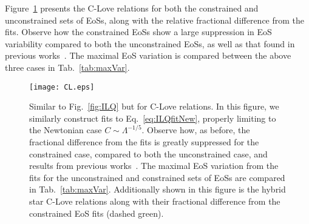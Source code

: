 \documentclass[prd,twocolumn,nofootinbib,superscriptaddress,amsmath,amssymb]{revtex4-1}
\begin{document}
Figure~\ref{fig:clove} presents the C-Love relations for both the constrained and unconstrained sets of EoSs, along with the relative fractional difference from the fits. 
Observe how the constrained EoSs show a large suppression in EoS variability compared to both the unconstrained EoSs, as well as that found in previous works~\cite{Yagi:binLove}.
The maximal EoS variation is compared between the above three cases in Tab.~\ref{tab:maxVar}.
\begin{figure}
\begin{center} 
\texttt{[image: CL.eps]}
\end{center}
\caption{
Similar to Fig.~\ref{fig:ILQ} but for C-Love relations.
In this figure, we similarly construct fits to  Eq.~\ref{eq:ILQfitNew}, properly limiting to the Newtonian case $C \sim \Lambda^{-1/5}$.
Observe how, as before, the fractional difference from the fits is greatly suppressed for the constrained case, compared to both the unconstrained case, and results from previous works~\cite{Yagi:binLove}.
The maximal EoS variation from the fits for the unconstrained and constrained sets of EoSs are compared in Tab.~\ref{tab:maxVar}.
Additionally shown in this figure is the hybrid star C-Love relations along with their fractional difference from the constrained EoS fits (dashed green).
}
\label{fig:clove}
\end{figure} 
\end{document}
